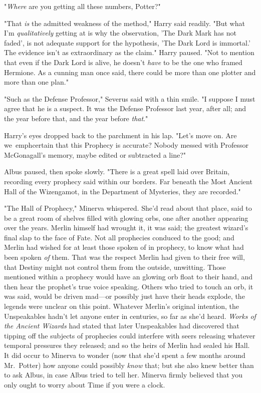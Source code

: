 "\emph{Where} are you getting all these numbers, Potter?"

"That \emph{is} the admitted weakness of the method," Harry said readily. "But 
what I'm \emph{qualitatively} getting at is why the observation, 'The Dark Mark 
has not faded', is not adequate support for the hypothesis, 'The Dark Lord is 
immortal.' The evidence isn't as extraordinary as the claim." Harry paused. 
"Not to mention that even if the Dark Lord is alive, he doesn't \emph{have} to 
be the one who framed Hermione. As a cunning man once said, there could be more 
than one plotter and more than one plan."

"Such as the Defense Professor," Severus said with a thin smile. "I suppose I 
must agree that he is a suspect. It was the Defense Professor last year, after 
all; and the year before that, and the year before \emph{that}."

Harry's eyes dropped back to the parchment in his lap. "Let's move on. Are 
we\ emph{certain} that this Prophecy is accurate? Nobody messed with Professor 
McGonagall's memory, maybe edited or subtracted a line?"

Albus paused, then spoke slowly. "There is a great spell laid over Britain, 
recording every prophecy said within our borders. Far beneath the Most Ancient 
Hall of the Wizengamot, in the Department of Mysteries, they are recorded."

"The Hall of Prophecy," Minerva whispered. She'd read about that place, said to 
be a great room of shelves filled with glowing orbs, one after another 
appearing over the years. Merlin himself had wrought it, it was said; the 
greatest wizard's final slap to the face of Fate. Not all prophecies conduced 
to the good; and Merlin had wished for at least those spoken of in prophecy, to 
know what had been spoken \emph{of} them. That was the respect Merlin had given 
to their free will, that Destiny might not control them from the outside, 
unwitting. Those mentioned within a prophecy would have an glowing orb float to 
their hand, and then hear the prophet's true voice speaking. Others who tried 
to touch an orb, it was said, would be driven mad---or possibly just have their 
heads explode, the legends were unclear on this point. Whatever Merlin's 
original intention, the Unspeakables hadn't let anyone enter in centuries, so 
far as she'd heard. \emph{Works of the Ancient Wizards} had stated that later 
Unspeakables had discovered that tipping off the subjects of prophecies could 
interfere with seers releasing whatever temporal pressures they released; and 
so the heirs of Merlin had sealed his Hall. It did occur to Minerva to wonder 
(now that she'd spent a few months around Mr.~Potter) how anyone could possibly 
\emph{know} that; but she also knew better than to ask Albus, in case Albus 
tried to tell her. Minerva firmly believed that you only ought to worry about 
Time if you were a clock.

